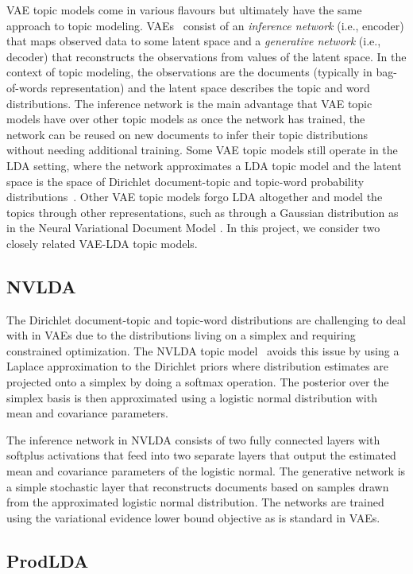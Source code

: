 \documentclass[10pt]{article}
\begin{document}
VAE topic models come in various flavours but ultimately have the same approach to topic modeling. VAEs~\cite{Kingma:2013} consist of an \textit{inference network} (i.e., encoder) that maps observed data to some latent space and a \textit{generative network} (i.e., decoder) that reconstructs the observations from values of the latent space. In the context of topic modeling, the observations are the documents (typically in bag-of-words representation) and the latent space describes the topic and word distributions. The inference network is the main advantage that VAE topic models have over other topic models as once the network has trained, the network can be reused on new documents to infer their topic distributions without needing additional training. Some VAE topic models still operate in the LDA setting, where the network approximates a LDA topic model and the latent space is the space of Dirichlet document-topic and topic-word probability distributions~\cite{Srivastava:2017}. Other VAE topic models forgo LDA altogether and model the topics through other representations, such as through a Gaussian distribution as in the Neural Variational Document Model \cite{Miao:2015}. In this project, we consider two closely related VAE-LDA topic models.

\subsection{NVLDA}

The Dirichlet document-topic and topic-word distributions are challenging to deal with in VAEs due to the distributions living on a simplex and requiring constrained optimization. The NVLDA topic model~\cite{Srivastava:2017} avoids this issue by using a Laplace approximation to the Dirichlet priors where distribution estimates are projected onto a simplex by doing a softmax operation. The posterior over the simplex basis is then approximated using a logistic normal distribution with mean and covariance parameters.

The inference network in NVLDA consists of two fully connected layers with softplus activations that feed into two separate layers that output the estimated mean and covariance parameters of the logistic normal. The generative network is a simple stochastic layer that reconstructs documents based on samples drawn from the approximated logistic normal distribution. The networks are trained using the variational evidence lower bound objective as is standard in VAEs.

\subsection{ProdLDA}
\end{document}
